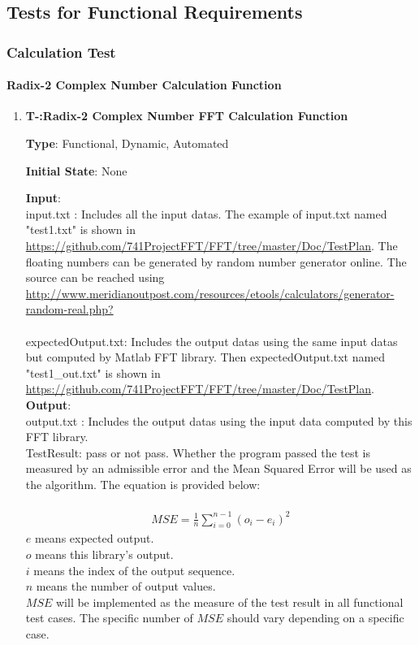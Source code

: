 \documentclass[12pt, titlepage]{article}
\newcounter{tnum}
\begin{document}
\subsection{Tests for Functional Requirements}

\subsubsection{Calculation Test}
		
\paragraph{Radix-2 Complex Number Calculation Function\\}

\begin{enumerate}

\item{\textbf{T-\thetnum \label{R2CFFT}:Radix-2 Complex Number FFT Calculation Function}}

\textbf {Type}: Functional, Dynamic, Automated
					
\textbf {Initial State}: None
					
\textbf {Input}:\\{\large input.txt} :  Includes all the input datas. The example of input.txt named "test1.txt" is shown in \url{https://github.com/741ProjectFFT/FFT/tree/master/Doc/TestPlan}. The floating numbers can be generated by random number generator online. The source can be reached using    \url  {http://www.meridianoutpost.com/resources/etools/calculators/generator-random-real.php?}\\\\ 
{\large expectedOutput.txt}:  Includes the output datas using the same input datas but computed by Matlab FFT library. Then expectedOutput.txt named "test1\_out.txt" is shown in \url{https://github.com/741ProjectFFT/FFT/tree/master/Doc/TestPlan}. \\ 

					
\textbf {Output}: \\{\large output.txt} : Includes the output datas using the input data computed by this FFT library.\\
{\large TestResult}: pass or not pass. Whether the program passed the test is measured by an admissible error and the Mean Squared Error will be used as the algorithm. The equation is provided below:\\\\
\begin{gather}
\mathit{MSE} = \frac{1}{n}\sum_{i=0}^{n-1} (o_i - e_i)^2
\end{gather}
$e$ means expected output. \\
$o$ means this library's output.\\
$i$ means the index of the output sequence. \\
$n$ means the number of output values.\\
$\mathit{MSE}$ will be implemented as the measure of the test result in all functional test cases. The specific number of $\mathit{MSE}$
should vary depending on a specific case.


\end{enumerate}
\end{document}
